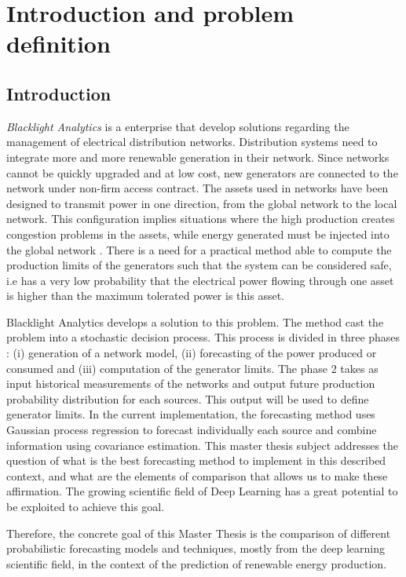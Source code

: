 
\section{Introduction and problem definition} \label{part1}

\subsection{Introduction} \label{intro}

\textit{Blacklight Analytics} is a enterprise that develop solutions regarding the management of electrical distribution networks. 
Distribution systems
need to integrate more and more renewable generation in their network. Since networks cannot be quickly upgraded and at low cost, new generators are connected to the network under non-firm access contract. The assets used in networks have been designed to transmit power in one direction, from the global network to the local network. This configuration implies situations where the high production creates congestion problems in the assets, while energy generated must be injected into the global network . There is
a need for a practical method able to compute the production limits of the generators such that the system can be considered safe, i.e has a very low probability that the electrical power flowing through one asset is higher than the maximum tolerated power is this asset.


Blacklight Analytics develops a solution to 
this problem. The method cast the problem into a stochastic decision process. This process is divided in three phases : (i) generation of a network model, (ii) forecasting of the power produced or consumed and (iii) computation of the generator limits. The phase 2 takes as input historical measurements of the networks and output future production probability distribution for each sources. This output will be used to define generator limits.
In the current implementation, the forecasting method uses Gaussian process regression to forecast individually each source and combine information using covariance estimation. 
This master thesis subject addresses the question of what is the best forecasting method to implement in this described context, and what are the elements of comparison that allows us to make these affirmation. The growing scientific field of Deep Learning has a great potential to be exploited to achieve this goal. 

Therefore, the concrete goal of this Master Thesis is the comparison of different probabilistic forecasting models and techniques, mostly from the deep learning scientific field,
in the context of the prediction of renewable energy production.

